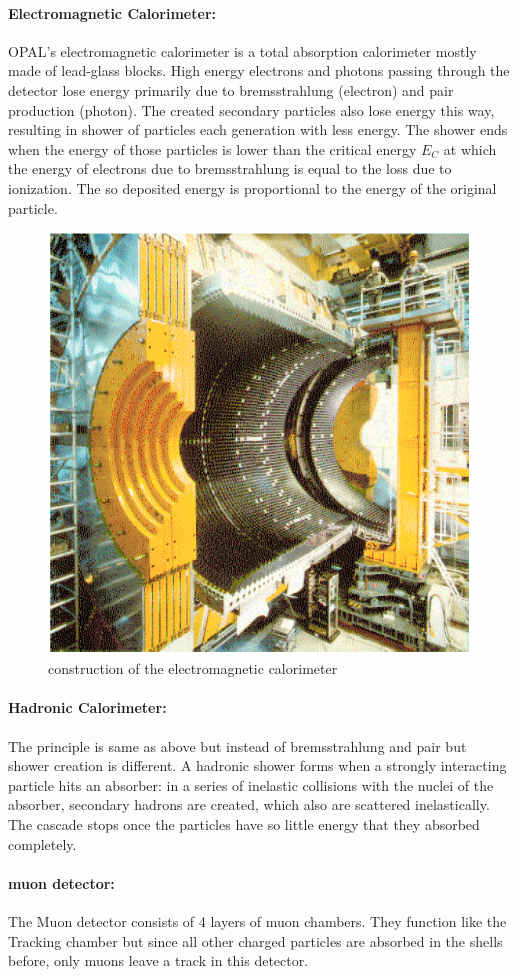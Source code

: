 \paragraph{Electromagnetic Calorimeter:}
OPAL's electromagnetic calorimeter is a total absorption calorimeter mostly made of lead-glass blocks\cite{cern}. High energy electrons and photons passing through the detector lose energy primarily due to bremsstrahlung (electron) and pair production (photon). The created secondary particles also lose energy this way, resulting in shower of particles each generation with less energy. The shower ends when the energy of those particles is lower than the critical energy $E_C$ at which the energy of electrons due to bremsstrahlung is equal to the loss due to ionization. The so deposited energy is proportional to the energy of the original particle\cite{muenchen}.
\begin{figure}[h]
\centering
\includegraphics[width=1.0\linewidth]{"graphics/elektromagnetisches kaloriemeter"}
\caption[electromagnetic calorimeter]{construction of the electromagnetic calorimeter}
\label{fig:elektromagnetischeskaloriemeter}
\end{figure}

\paragraph{Hadronic Calorimeter:}
The principle is same as above but instead of bremsstrahlung and pair but shower creation is different. A hadronic shower forms when a strongly interacting particle hits an absorber: in a series of inelastic collisions with the nuclei of the absorber, secondary hadrons are created, which also are scattered inelastically. The cascade stops once the particles have so little energy that they absorbed completely.
\paragraph{muon detector:}
The Muon detector consists of 4 layers of muon chambers. They function like the Tracking chamber but since all other charged particles are absorbed in the shells before, only muons leave a track in this detector.\cite{muenchen}
